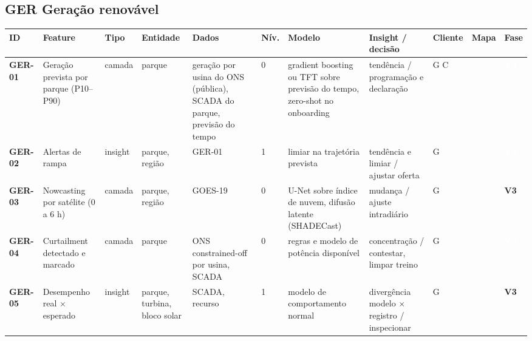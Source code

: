 \subsection*{GER \textperiodcentered{} Geração renovável}
\label{cat:GER}
{\footnotesize\setlength{\tabcolsep}{3pt}
\begin{longtable}{@{}P{1.35cm}P{4.1cm}P{1.3cm}P{3.1cm}P{3.7cm}C{0.6cm}P{3.6cm}P{3.3cm}P{1.1cm}P{0.9cm}P{1.1cm}@{}}
\toprule
\textbf{ID} & \textbf{Feature} & \textbf{Tipo} & \textbf{Entidade} & \textbf{Dados} & \textbf{Nív.} & \textbf{Modelo} & \textbf{Insight / decisão} & \textbf{Cliente} & \textbf{Mapa} & \textbf{Fase} \\
\midrule\endhead
\textbf{GER-01} & Geração prevista por parque (P10--P90) & camada & parque & geração por usina do ONS (pública), SCADA do parque, previsão do tempo & 0 & gradient boosting ou TFT sobre previsão do tempo, zero-shot no onboarding & tendência / programação e declaração & G C &  & \colorbox{fV2}{\scriptsize \textcolor{white}{\textbf{V2}}} \\
\textbf{GER-02} & Alertas de rampa & insight & parque, região & GER-01 & 1 & limiar na trajetória prevista & tendência e limiar / ajustar oferta & G &  & \colorbox{fV2}{\scriptsize \textcolor{white}{\textbf{V2}}} \\
\textbf{GER-03} & Nowcasting por satélite (0 a 6 h) & camada & parque, região & GOES-19 & 0 & U-Net sobre índice de nuvem, difusão latente (SHADECast) & mudança / ajuste intradiário & G &  & \colorbox{fV3}{\scriptsize \textbf{V3}} \\
\textbf{GER-04} & Curtailment detectado e marcado & camada & parque & ONS constrained-off por usina, SCADA & 0 & regras e modelo de potência disponível & concentração / contestar, limpar treino & G &  & \colorbox{fV2}{\scriptsize \textcolor{white}{\textbf{V2}}} \\
\textbf{GER-05} & Desempenho real $\times$ esperado & insight & parque, turbina, bloco solar & SCADA, recurso & 1 & modelo de comportamento normal & divergência modelo $\times$ registro / inspecionar & G &  & \colorbox{fV3}{\scriptsize \textbf{V3}} \\

\end{longtable}}
